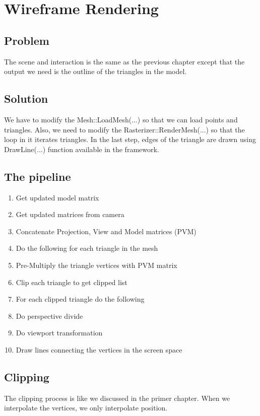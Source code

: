\chapter{Wireframe Rendering}
\section{Problem}
The scene and interaction is the same as the previous chapter except that the output we need is the outline of the triangles in the model.
\section{Solution}
We have to modify the Mesh::LoadMesh(...) so that we can load points and triangles. Also, we need to modify the Rasterizer::RenderMesh(...) so that the loop in it iterates triangles. In the last step, edges of the triangle are drawn using DrawLine(...) function available in the framework.

\section{The pipeline}
\begin{enumerate}
    \item Get updated model matrix
    \item Get updated matrices from camera
    \item Concatenate Projection, View and Model matrices (PVM)
     \item Do the following for each triangle in the mesh
    \item Pre-Multiply the triangle vertices with PVM matrix
    \item Clip each triangle to get clipped list
    \item For each clipped triangle do the following
    \item Do perspective divide
    \item Do viewport transformation
    \item Draw lines connecting the vertices in the screen space
\end{enumerate}

\section{Clipping}
The clipping process is like we discussed in the primer chapter. When we interpolate the vertices, we only interpolate position.
\clearpage 